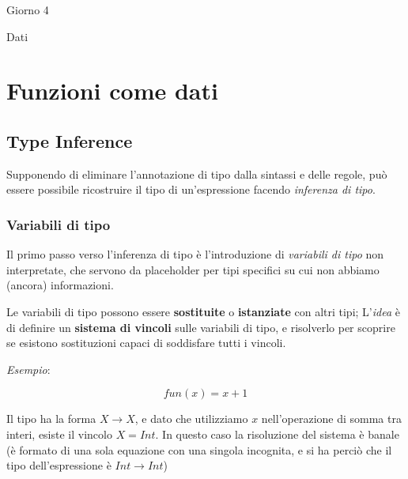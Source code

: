 \documentclass[a4paper,10pt]{article}
\begin{document}
\begin{center}
    \LARGE Giorno 4\smallskip

    \Large Dati
\end{center}\smallskip
\begin{abstract}
 
\end{abstract}

\section{Funzioni come dati}
\subsection{Type Inference}
Supponendo di eliminare l'annotazione di tipo dalla sintassi e delle regole, può essere possibile ricostruire il tipo di un'espressione facendo \emph{inferenza di tipo}.
\subsubsection{Variabili di tipo}
Il primo passo verso l'inferenza di tipo è l'introduzione di \emph{variabili di tipo} non interpretate, che servono da placeholder per tipi specifici su cui non abbiamo (ancora) informazioni.\smallskip

Le variabili di tipo possono essere \textbf{sostituite} o \textbf{istanziate} con altri tipi; L'\emph{idea} è di definire un \textbf{sistema di vincoli} sulle variabili di tipo, e risolverlo per scoprire se esistono sostituzioni capaci di soddisfare tutti i vincoli.\bigskip

\emph{Esempio}:

\[ fun(x) = x + 1 \]

Il tipo ha la forma $X \to X$, e dato che utilizziamo $x$ nell'operazione di somma tra interi, esiste il vincolo $X = Int$. In questo caso la risoluzione del sistema è banale (è formato di una sola equazione con una singola incognita, e si ha perciò che il tipo dell'espressione è $Int \to Int$)
\end{document}
